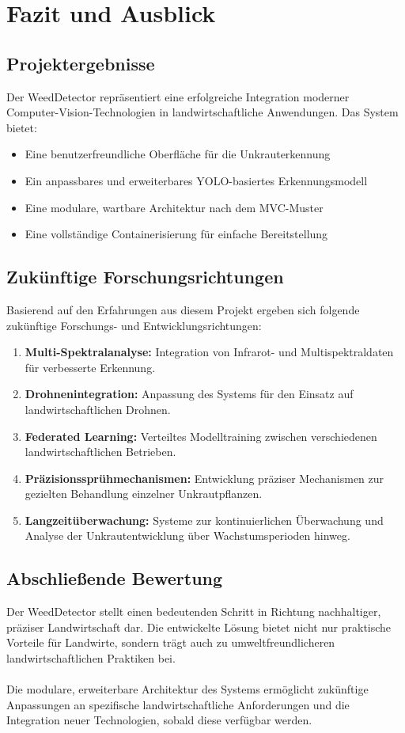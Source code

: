 \documentclass[12pt, a4paper]{scrreprt}
\begin{document}
\chapter{Fazit und Ausblick}

\section{Projektergebnisse}
Der WeedDetector repräsentiert eine erfolgreiche Integration moderner Computer-Vision-Technologien in landwirtschaftliche Anwendungen. Das System bietet:

\begin{itemize}
    \item Eine benutzerfreundliche Oberfläche für die Unkrauterkennung
    \item Ein anpassbares und erweiterbares YOLO-basiertes Erkennungsmodell
    \item Eine modulare, wartbare Architektur nach dem MVC-Muster
    \item Eine vollständige Containerisierung für einfache Bereitstellung
\end{itemize}

\section{Zukünftige Forschungsrichtungen}
Basierend auf den Erfahrungen aus diesem Projekt ergeben sich folgende zukünftige Forschungs- und Entwicklungsrichtungen:

\begin{enumerate}
    \item \textbf{Multi-Spektralanalyse:} Integration von Infrarot- und Multispektraldaten für verbesserte Erkennung.
    \item \textbf{Drohnenintegration:} Anpassung des Systems für den Einsatz auf landwirtschaftlichen Drohnen.
    \item \textbf{Federated Learning:} Verteiltes Modelltraining zwischen verschiedenen landwirtschaftlichen Betrieben.
    \item \textbf{Präzisionssprühmechanismen:} Entwicklung präziser Mechanismen zur gezielten Behandlung einzelner Unkrautpflanzen.
    \item \textbf{Langzeitüberwachung:} Systeme zur kontinuierlichen Überwachung und Analyse der Unkrautentwicklung über Wachstumsperioden hinweg.
\end{enumerate}

\section{Abschließende Bewertung}
Der WeedDetector stellt einen bedeutenden Schritt in Richtung nachhaltiger, präziser Landwirtschaft dar. Die entwickelte Lösung bietet nicht nur praktische Vorteile für Landwirte, sondern trägt auch zu umweltfreundlicheren landwirtschaftlichen Praktiken bei.\\
\\
Die modulare, erweiterbare Architektur des Systems ermöglicht zukünftige Anpassungen an spezifische landwirtschaftliche Anforderungen und die Integration neuer Technologien, sobald diese verfügbar werden.
\end{document}

